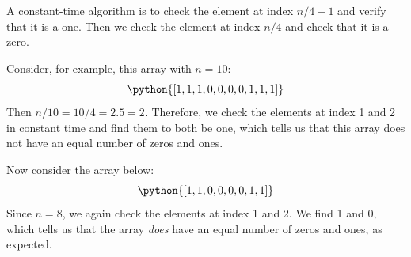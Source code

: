 \begin{prob}[(2 points)]
\begin{subprobset}
\begin{subprob}
\begin{soln}
                A constant-time algorithm is to check the element at index $n/4
                - 1$ and verify that it is a one. Then we check the element at
                index $n/4 $ and check that it is a zero.

                Consider, for example, this array with $n = 10$:
                \[
                    \python{[1, 1, 1, 0, 0, 0, 0, 1, 1, 1]}
                \]
                Then $n / 10 = 10 / 4 = 2.5 = 2$. Therefore, we check the
                elements at index 1 and 2 in constant time and find them to
                both be one, which tells us that this array does not have an
                equal number of zeros and ones.

                Now consider the array below:
                \[
                    \python{[1, 1, 0, 0, 0, 0, 1, 1]}
                \]
                Since $n = 8$, we again check the elements at index 1 and 2. We find 1
                and 0, which tells us that the array \emph{does} have an equal number
                of zeros and ones, as expected.
            \end{soln}

        \end{subprob}

    \end{subprobset}

\end{prob}
